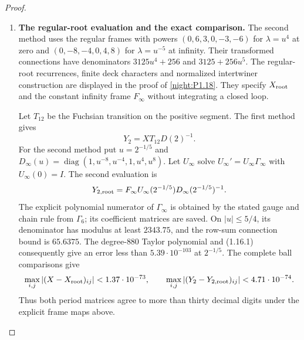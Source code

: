 \begin{proof}
\begin{enumerate}[label={$\langle1\rangle$\arabic*.}]
Likewise, the real intersection in (1.15.3) is computed from an
invertible four-equation subsystem in
$(\operatorname{Re}v_2,\operatorname{Im}v_2,
  \operatorname{Re}v_1,\operatorname{Im}v_1)$.
 proves the existence and uniqueness of the full
intersection, so this subsystem encloses that intersection.
At $\lambda=1$ the resulting height ball has radius less than
$4\cdot10^{-91}$.  It is contained in the following wider displayed
interval:
\[
\begin{aligned}
 h_b(1)\in\bigl[&
 -1.03427662241632179949424884537834605259496477790218821132\\
 &\qquad\mathbin{\pm}8.11\cdot10^{-57}\bigr].
\end{aligned}
\]
It lies strictly between the two decimal endpoints in the statement.
Since $5/(3\pi)<1$, we have $h_b(1)+5/(3\pi)<0$.
The cusp asymptotic in \cref{night:P1.8} gives $h_b+c\to+\infty$ along a path
to the cusp.  Continuity on a path from $1$ to that region therefore
supplies a zero for $c=5/(3\pi)$, proving its inadmissibility.

\item \textbf{The regular-root evaluation and the exact comparison.}
The second method uses the regular frames with powers
$(0,6,3,0,-3,-6)$ for $\lambda=u^4$ at zero and
$(0,-8,-4,0,4,8)$ for $\lambda=u^{-5}$ at infinity.
Their transformed connections have denominators
$3125u^4+256$ and $3125+256u^5$.  The regular-root recurrences,
finite deck characters and normalized intertwiner construction
are displayed in the proof of \cref{night:P1.18}.  They specify $X_{\rm root}$
and the constant infinity frame $F_\infty$ without integrating a
closed loop.

Let $T_{12}$ be the Fuchsian transition on the positive segment.
The first method gives
\[
 Y_2=XT_{12}D(2)^{-1}.
\]
For the second method put $u=2^{-1/5}$ and
$D_\infty(u)=\operatorname{diag}(1,u^{-8},u^{-4},1,u^4,u^8)$.
Let $U_\infty$ solve $U_\infty'=U_\infty\Gamma_\infty$ with $U_\infty(0)=I$.  The second evaluation is
\[
 Y_{2,\rm root}=F_\infty U_\infty(2^{-1/5})
                         D_\infty(2^{-1/5})^{-1}.
\]
The explicit polynomial numerator of $\Gamma_\infty$ is obtained
by the stated gauge and chain rule from $\Gamma_6$; its coefficient
matrices are saved.  On $|u|\le5/4$, its denominator has modulus
at least $2343.75$, and the row-sum connection bound is $65.6375$.
The degree-$880$ Taylor polynomial and (1.16.1) consequently give
an error less than $5.39\cdot10^{-103}$ at $2^{-1/5}$.
The complete ball comparisons give
\[
 \max_{i,j}|(X-X_{\rm root})_{ij}|<1.37\cdot10^{-73},\qquad
 \max_{i,j}|(Y_2-Y_{2,\rm root})_{ij}|<4.71\cdot10^{-74}.
\]
Thus both period matrices agree to more than thirty decimal digits
under the explicit frame maps above.


\end{enumerate}
\end{proof}
